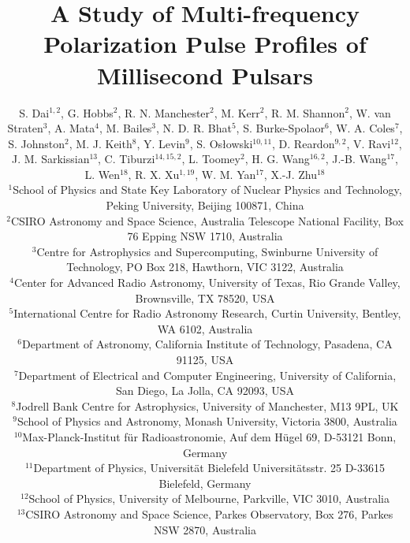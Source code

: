 \documentclass[useAMS,usenatbib]{mn2e}
\begin{document}
\title[A Study of Multi-frequency Polarization Pulse Profiles of Millisecond Pulsars]{A Study of Multi-frequency Polarization Pulse Profiles of Millisecond Pulsars}
\author[S. Dai et al.]{S. Dai$^{1,2}$, G. Hobbs$^2$, R. N. Manchester$^2$, M. Kerr$^2$, R. M. Shannon$^2$, W. van Straten$^3$,   
\newauthor A. Mata$^4$, M. Bailes$^3$, N. D. R. Bhat$^5$, S. Burke-Spolaor$^6$, W. A. Coles$^7$, S. Johnston$^2$, 
\newauthor M. J. Keith$^8$, Y. Levin$^9$, S. Os\l owski$^{10,11}$, D. Reardon$^{9,2}$, V. Ravi$^{12}$, J. M. Sarkissian$^{13}$, 
\newauthor C. Tiburzi$^{14,15,2}$, L. Toomey$^{2}$, H. G. Wang$^{16,2}$, J.-B. Wang$^{17}$, L. Wen$^{18}$, R. X. Xu$^{1,19}$, 
\newauthor W. M. Yan$^{17}$, X.-J. Zhu$^{18}$\\
$^1$School of Physics and State Key Laboratory of Nuclear Physics and Technology, Peking University, Beijing 100871, China\\
$^2$CSIRO Astronomy and Space Science, Australia Telescope National Facility, Box 76 Epping NSW 1710, Australia\\
$^3$Centre for Astrophysics and Supercomputing, Swinburne University of Technology, PO Box 218, Hawthorn, VIC 3122, Australia\\
$^4$Center for Advanced Radio Astronomy, University of Texas, Rio Grande Valley, Brownsville, TX 78520, USA\\
$^5$International Centre for Radio Astronomy Research, Curtin University, Bentley, WA 6102, Australia\\
$^6$Department of Astronomy, California Institute of Technology, Pasadena, CA 91125, USA\\
$^7$Department of Electrical and Computer Engineering, University of California, San Diego, La Jolla, CA 92093, USA\\
$^8$Jodrell Bank Centre for Astrophysics, University of Manchester, M13 9PL, UK\\
$^9$School of Physics and Astronomy, Monash University, Victoria 3800, Australia\\
$^{10}$Max-Planck-Institut f\"{u}r Radioastronomie, Auf dem H\"{u}gel 69, D-53121 Bonn, Germany\\
$^{11}$Department of Physics, Universit\"{a}t Bielefeld Universit\"{a}tsstr. 25 D-33615 Bielefeld, Germany\\
$^{12}$School of Physics, University of Melbourne, Parkville, VIC 3010, Australia\\
$^{13}$CSIRO Astronomy and Space Science, Parkes Observatory, Box 276, Parkes NSW 2870, Australia\\
}
\end{document}
